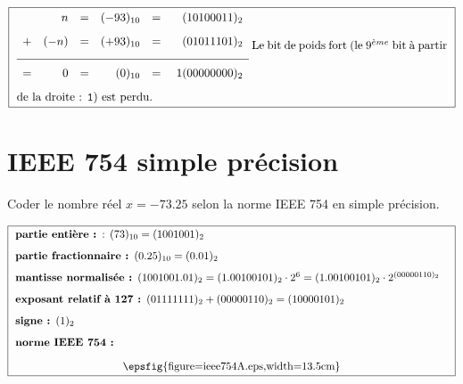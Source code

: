 \documentclass[12pt]{article}
\begin{document}
\begin{enumerate}
	$$\framebox[13.5cm]{\begin{minipage}{13cm}
$\begin{array}{lrrrrr}
  & n &=& (- 93)_{10} &=& \ (10100011)_2\\[3mm]
+ & (-n) &=& (+ 93)_{10} &=& \ (01011101)_2\\[3mm]
\hline
\\[-2mm]
= & 0 &=& (0)_{10} &=& \ 1(00000000)_2
\end{array}$
\vspace*{3mm}

Le bit de poids fort (le $9^{\grave eme}$ bit à partir de la droite : {\tt 1})
est perdu.
\end{minipage}}$$
\end{enumerate}

\section{IEEE 754 simple précision}
Coder le nombre réel $x=-73.25$ selon la norme IEEE 754 en simple précision.
	
	$$\framebox[14.5cm]{
\begin{minipage}{14cm}
\begin{description}
\item[partie entière :] : $(73)_{10} = (1001001)_2$
\item[partie fractionnaire :] $(0.25)_{10} = (0.01)_2$
\item[mantisse normalisée :] $(1001001.01)_2 =
(1.00100101)_2 \cdot 2^6 = (1.00100101)_2 \cdot 2^{(00000110)_2}$
\item[exposant relatif à 127 :] $(01111111)_2 + (00000110)_2 = (10000101)_2$
\item[signe :] $(1)_2$
\item[norme IEEE 754 :]
\end{description}
\centerline{\epsfig{figure=ieee754A.eps,width=13.5cm}}
\end{minipage}
}$$

\label{fini}
\end{document}
